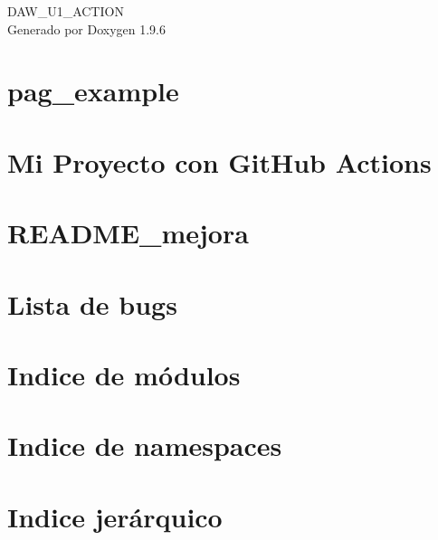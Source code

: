 \documentclass[twoside]{book}
\newcommand{\+}{\discretionary{\mbox{\scriptsize$\hookleftarrow$}}{}{}}
\newcommand{\clearemptydoublepage}{%
    \newpage{\pagestyle{empty}\cleardoublepage}%
  }
\begin{document}
  \raggedbottom
    \hypersetup{pageanchor=false,
                bookmarksnumbered=true,
                pdfencoding=unicode
               }
  \begin{titlepage}
  \vspace*{7cm}
  \begin{center}%
  {\Large DAW\+\_\+\+U1\+\_\+\+ACTION}\\
  \vspace*{1cm}
  {\large Generado por Doxygen 1.9.6}\\
  \end{center}
  \end{titlepage}
  \clearemptydoublepage
  \tableofcontents
  \clearemptydoublepage
  \hypersetup{pageanchor=true}
\chapter{pag\+\_\+example}
\label{pag_example}

\chapter{Mi Proyecto con Git\+Hub Actions}
\label{md_README}

\chapter{README\+\_\+mejora}
\label{md_README_mejora}

\chapter{Lista de bugs}
\label{bug}

\chapter{Indice de módulos}

\chapter{Indice de namespaces}

\chapter{Indice jerárquico}

\end{document}

